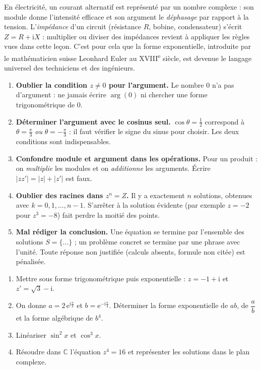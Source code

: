 \documentclass[11pt]{article}
\begin{document}
\begin{savaistu}
En électricité, un courant alternatif est représenté par un nombre complexe : son module donne l'intensité efficace et son argument le \emph{déphasage} par rapport à la tension. L'\emph{impédance} d'un circuit (résistance $R$, bobine, condensateur) s'écrit $Z = R + \mathrm{i}X$ : multiplier ou diviser des impédances revient à appliquer les règles vues dans cette leçon. C'est pour cela que la forme exponentielle, introduite par le mathématicien suisse Leonhard Euler au XVIII\textsuperscript{e} siècle, est devenue le langage universel des techniciens et des ingénieurs.
\end{savaistu}

\begin{attention}
\begin{enumerate}
\item \textbf{Oublier la condition $z \neq 0$ pour l'argument.} Le nombre $0$ n'a pas d'argument : ne jamais écrire $\arg(0)$ ni chercher une forme trigonométrique de $0$.
\item \textbf{Déterminer l'argument avec le cosinus seul.} $\cos\theta = \frac{1}{2}$ correspond à $\theta = \frac{\pi}{3}$ \emph{ou} $\theta = -\frac{\pi}{3}$ : il faut vérifier le signe du sinus pour choisir. Les deux conditions sont indispensables.
\item \textbf{Confondre module et argument dans les opérations.} Pour un produit : on \emph{multiplie} les modules et on \emph{additionne} les arguments. Écrire $|z z'| = |z| + |z'|$ est faux.
\item \textbf{Oublier des racines dans $z^n = Z$.} Il y a exactement $n$ solutions, obtenues avec $k = 0, 1, \ldots, n-1$. S'arrêter à la solution évidente (par exemple $z = -2$ pour $z^3 = -8$) fait perdre la moitié des points.
\item \textbf{Mal rédiger la conclusion.} Une équation se termine par l'ensemble des solutions $S = \{\ldots\}$ ; un problème concret se termine par une phrase avec l'unité. Toute réponse non justifiée (calculs absents, formule non citée) est pénalisée.
\end{enumerate}
\end{attention}

\begin{exercice}
\begin{enumerate}
\item Mettre sous forme trigonométrique puis exponentielle : $z = -1 + \mathrm{i}$ et $z' = \sqrt{3} - \mathrm{i}$.
\item On donne $a = 2\,\mathrm{e}^{\mathrm{i}\frac{\pi}{3}}$ et $b = \mathrm{e}^{-\mathrm{i}\frac{\pi}{4}}$. Déterminer la forme exponentielle de $ab$, de $\dfrac{a}{b}$ et la forme algébrique de $b^4$.
\item Linéariser $\sin^2 x$ et $\cos^3 x$.
\item Résoudre dans $\mathbb{C}$ l'équation $z^4 = 16$ et représenter les solutions dans le plan complexe.
\end{enumerate}
\end{exercice}
\end{document}

